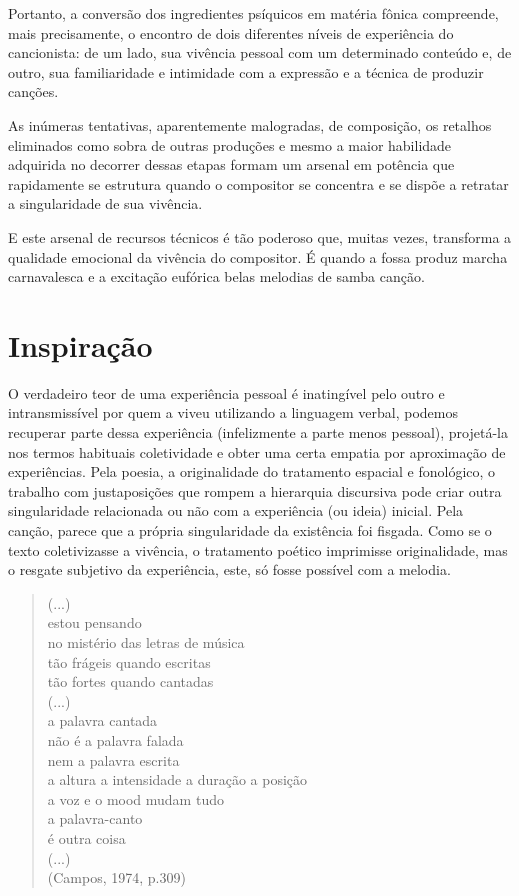 Portanto, a conversão dos ingredientes psíquicos em matéria fônica
compreende, mais precisamente, o encontro de dois diferentes níveis de
experiência do cancionista: de um lado, sua vivência pessoal com um
determinado conteúdo e, de outro, sua familiaridade e intimidade com a
expressão e a técnica de produzir canções.~

As inúmeras tentativas, aparentemente malogradas, de composição, os
retalhos eliminados como sobra de outras produções e mesmo a maior
habilidade adquirida no decorrer dessas etapas formam um arsenal em
potência que rapidamente se estrutura quando o compositor se concentra e
se dispõe a retratar a singularidade de sua vivência.~

E este arsenal de recursos técnicos é tão poderoso que, muitas vezes,
transforma a qualidade emocional da vivência do compositor. É quando a
fossa produz marcha carnavalesca e a excitação eufórica belas melodias
de samba canção.~

\section{Inspiração}

O verdadeiro teor de uma experiência pessoal é inatingível pelo outro e
intransmissível por quem a viveu utilizando a linguagem verbal, podemos
recuperar parte dessa experiência (infelizmente a parte menos pessoal),
projetá-la nos termos habituais coletividade e obter uma certa empatia
por aproximação de experiências. Pela poesia, a originalidade do
tratamento espacial e fonológico, o trabalho com justaposições que
rompem a hierarquia discursiva pode criar outra singularidade
relacionada ou não com a experiência (ou ideia) inicial. Pela canção,
parece que a própria singularidade da existência foi fisgada. Como se o
texto coletivizasse a vivência, o tratamento poético imprimisse
originalidade, mas o resgate subjetivo da experiência, este, só fosse
possível com a melodia.

\begin{verse}
(...)\\
estou pensando\\
no mistério das letras de música\\
tão frágeis quando escritas\\
tão fortes quando cantadas\\
(...)\\
a palavra cantada\\
não é a palavra falada\\
nem a palavra escrita\\
a altura a intensidade a duração a posição\\
a voz e o mood mudam tudo\\
a palavra-canto\\
é outra coisa\\
(...)\\
\hfill(Campos, 1974, p.309)
\end{verse}

